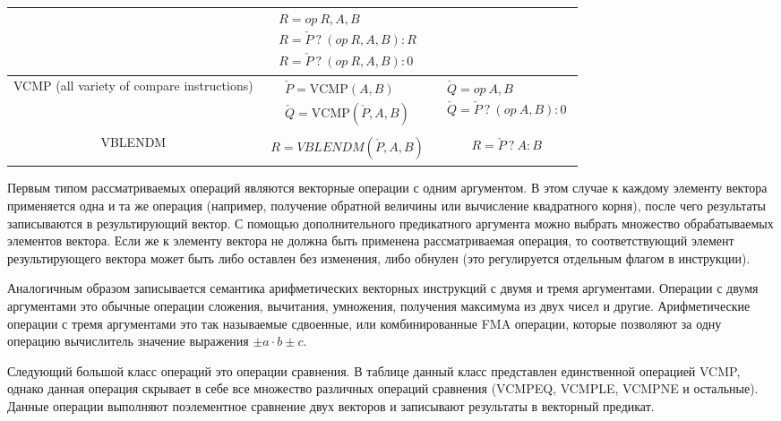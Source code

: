 \documentclass[
11pt,%
tightenlines,%
twoside,%
onecolumn,%
nofloats,%
nobibnotes,%
nofootinbib,%
superscriptaddress,%
noshowpacs,%
centertags]%
{revtex4}
\begin{document}
\begin{table}[!h]
\begin{tabular}{|c|c|c|}
& $\begin{matrix} R = op \ R, A, B \\ R = \check{P} \ ? \ (op \ R, A, B) : R \\ R = \check{P} \ ? \ (op \ R, A, B) : 0 \end{matrix}$ \\
\hline
\parbox{7.5cm}{VCMP (all variety of compare instructions)}
& $\begin{matrix} \check{P} = \text{VCMP}(A, B) \\ \check{Q} = \text{VCMP}(\check{P}, A, B) \end{matrix}$
& $\begin{matrix} \check{Q} = op \ A, B \\ \check{Q} = \check{P} \ ? \ (op \ A, B) : 0 \end{matrix}$ \\
\hline
\parbox{7.5cm}{VBLENDM}
& $\begin{matrix} R = VBLENDM(\check{P}, A, B) \end{matrix}$
& $\begin{matrix} R = \check{P} \ ? \ A : B \end{matrix}$ \\
\hline
\end{tabular}
\label{tab:avx512instructions}
\end{table}   

Первым типом рассматриваемых операций являются векторные операции с одним аргументом.
В этом случае к каждому элементу вектора применяется одна и та же операция (например, получение обратной величины или вычисление квадратного корня), после чего результаты записываются в результирующий вектор.
С помощью дополнительного предикатного аргумента можно выбрать множество обрабатываемых элементов вектора.
Если же к элементу вектора не должна быть применена рассматриваемая операция, то соответствующий элемент результирующего вектора может быть либо оставлен без изменения, либо обнулен (это регулируется отдельным флагом в инструкции).

Аналогичным образом записывается семантика арифметических векторных инструкций с двумя и тремя аргументами.
Операции с двумя аргументами это обычные операции сложения, вычитания, умножения, получения максимума из двух чисел и другие.
Арифметические операции с тремя аргументами это так называемые сдвоенные, или комбинированные FMA операции, которые позволяют за одну операцию вычислитель значение выражения $\pm a \cdot b \pm c$.

Следующий большой класс операций это операции сравнения.
В таблице данный класс представлен единственной операцией VCMP, однако данная операция скрывает в себе все множество различных операций сравнения (VCMPEQ, VCMPLE, VCMPNE и остальные).
Данные операции выполняют поэлементное сравнение двух векторов и записывают результаты в векторный предикат.
\end{document}
